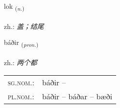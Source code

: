 \documentclass[frontgrid, backgrid]{flacards}\usepackage[]{graphicx}\usepackage[]{xcolor}
\begin{document}
\renewcommand{\flhead}{\vskip5pt \fboxsep=0pt {\small\bfseries\footnotesize Nafnorð | 名词}}
\renewcommand{\fcfoot}{\vskip5pt \fboxsep=0pt \hspace{2pt}{\small\bfseries\footnotesize 1K}}

\renewcommand{\blhead}{\vskip5pt {\small\bfseries\footnotesize Nafnorð | 名词 }}
\renewcommand{\bcfoot}{\vskip5pt \hspace{2pt}{\small\bfseries\footnotesize 1K}}


{lok \small{\textsubscript{(\textit{n.})}} \\[1ex] %
\textphonetic{[lɔːk]} \\
zh.: \emph{盖；结尾} \\  [2ex]
\renewcommand*{\arraystretch}{0.8}
}

\renewcommand{\flhead}{\vskip5pt \fboxsep=0pt {\small\bfseries\footnotesize Fornafn | 代词}}
\renewcommand{\fcfoot}{\vskip5pt \fboxsep=0pt \hspace{2pt}{\small\bfseries\footnotesize 1K}}

\renewcommand{\blhead}{\vskip5pt {\small\bfseries\footnotesize Fornafn | 代词 }}
\renewcommand{\bcfoot}{\vskip5pt \hspace{2pt}{\small\bfseries\footnotesize 1K}}


{báðir \small{\textsubscript{(\textit{pron.})}} \\[1ex] %
\textphonetic{[pauːðɪr]} \\
zh.: \emph{两个都} \\  [2ex]
\renewcommand*{\arraystretch}{0.8}
\begin{tabular}{ll}
\textsc{sg.nom.}: & báðir  -- \\ 
\textsc{pl.nom.}: & báðir -- báðar -- bæði
\end{tabular}
}
\end{document}

